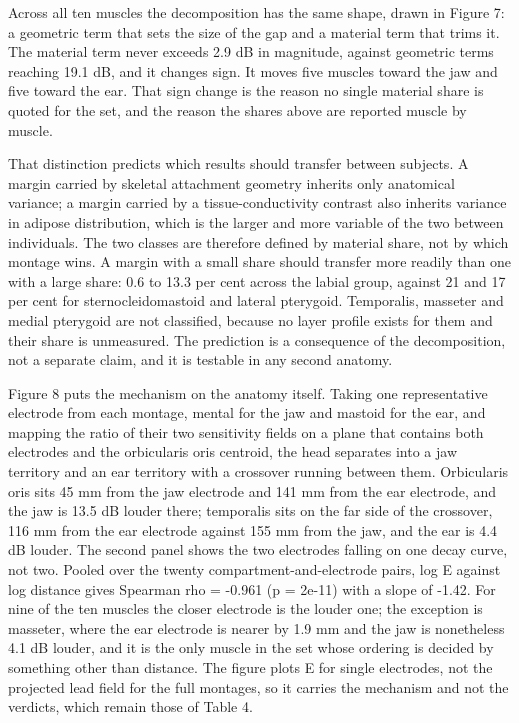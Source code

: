 \documentclass[
  11pt,
  letterpaper,
]{article}
\newcounter{none} %
\begin{document}
Across all ten muscles the decomposition has the same shape, drawn in Figure 7: a
geometric term that sets the size of the gap and a material term that trims it.
The material term never exceeds 2.9 dB in magnitude, against geometric terms
reaching 19.1 dB, and it changes sign. It moves five muscles toward the jaw and
five toward the ear. That sign change is the reason no single material share is
quoted for the set, and the reason the shares above are reported muscle by
muscle.

That distinction predicts which results should transfer between subjects. A
margin carried by skeletal attachment geometry inherits only anatomical
variance; a margin carried by a tissue-conductivity contrast also inherits
variance in adipose distribution, which is the larger and more variable of the
two between individuals. The two classes are therefore defined by material
share, not by which montage wins. A margin with a small share should transfer
more readily than one with a large share: 0.6 to 13.3 per cent across the labial
group, against 21 and 17 per cent for sternocleidomastoid and lateral pterygoid.
Temporalis, masseter and medial pterygoid are not classified, because no layer
profile exists for them and their share is unmeasured. The prediction is a
consequence of the decomposition, not a separate claim, and it is testable in
any second anatomy.

Figure 8 puts the mechanism on the anatomy itself. Taking one representative
electrode from each montage, mental for the jaw and mastoid for the ear, and
mapping the ratio of their two sensitivity fields on a plane that contains both
electrodes and the orbicularis oris centroid, the head separates into a jaw
territory and an ear territory with a crossover running between them.
Orbicularis oris sits 45 mm from the jaw electrode and 141 mm from the ear
electrode, and the jaw is 13.5 dB louder there; temporalis sits on the far side
of the crossover, 116 mm from the ear electrode against 155 mm from the jaw, and
the ear is 4.4 dB louder. The second panel shows the two electrodes falling on
one decay curve, not two. Pooled over the twenty compartment-and-electrode
pairs, log \textbar E\textbar{} against log distance gives Spearman rho = -0.961 (p = 2e-11) with
a slope of -1.42. For nine of the ten muscles the closer electrode is the louder
one; the exception is masseter, where the ear electrode is nearer by 1.9 mm and
the jaw is nonetheless 4.1 dB louder, and it is the only muscle in the set whose
ordering is decided by something other than distance. The figure plots \textbar E\textbar{} for
single electrodes, not the projected lead field for the full montages, so it
carries the mechanism and not the verdicts, which remain those of Table 4.
\end{document}

